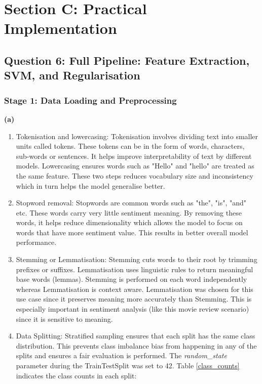 \section{Section C: Practical Implementation}

\subsection{Question 6: Full Pipeline: Feature Extraction, SVM, and Regularisation}

\subsubsection{Stage 1: Data Loading and Preprocessing}

\noindent\textbf{(a)}
\begin{enumerate}[label=\roman*., topsep=0pt, itemsep=2pt]
    \item Tokenisation and lowercasing: Tokenisation involves dividing text into smaller units called tokens. These tokens can be in the form of words, characters, sub-words or sentences.
          It helps improve interpretability of text by different models. Lowercasing ensures words such as "Hello" and "hello" are treated as the same feature. These two steps reduces
          vocabulary size and inconsistency which in turn helps the model generalise better.
    \item Stopword removal: Stopwords are common words such as "the", "is", "and" etc. These words carry very little sentiment meaning. By removing these words, it helps reduce dimensionality
          which allows the model to focus on words that have more sentiment value. This results in better overall model performance.
    \item Stemming or Lemmatisation: Stemming cuts words to their root by trimming prefixes or suffixes. Lemmatisation uses linguistic rules to return meaningful base words (lemmas).
          Stemming is performed on each word independently whereas Lemmatisation is context aware. Lemmatisation was chosen for this use case since it preserves meaning more accurately than
          Stemming. This is especially important in sentiment analysis (like this movie review scenario) since it is sensitive to meaning.
    \item Data Splitting: Stratified sampling ensures that each split has the same class distribution. This prevents class imbalance bias from happening in any of the splits and ensures a
          fair evaluation is performed. The \emph{random\_state} parameter during the TrainTestSplit was set to 42. Table \ref{class_counts} indicates the class counts in each split:

\end{enumerate}
